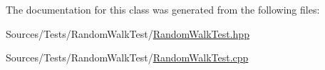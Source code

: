 The documentation for this class was generated from the following files\+:\begin{DoxyCompactItemize}
\item 
Sources/\+Tests/\+Random\+Walk\+Test/\hyperlink{_random_walk_test_8hpp}{Random\+Walk\+Test.\+hpp}\item 
Sources/\+Tests/\+Random\+Walk\+Test/\hyperlink{_random_walk_test_8cpp}{Random\+Walk\+Test.\+cpp}\end{DoxyCompactItemize}
